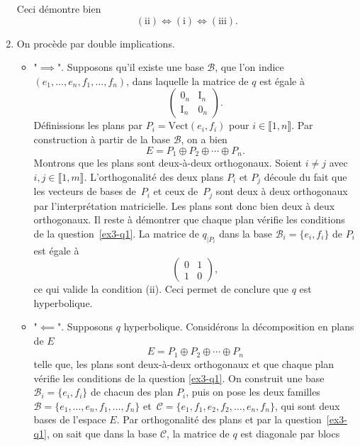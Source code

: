 \documentclass{../../td}
\begin{document}
\begin{enumerate}
\begin{itemize}
      \end{itemize}
      Ceci démontre bien \[
        (\text{ii}) \iff (\text{i}) \iff (\text{iii})
      .\] 
    \item On procède par double implications.
      \label{ex3-q2}
      \begin{itemize}
        \item "$\implies$".
          Supposons qu'il existe une base $\mathcal{B}$, que l'on indice $(e_1, \ldots, e_n, f_1, \ldots, f_n)$, dans laquelle la matrice de $q$ est égale à \[
            \begin{pmatrix} 0_n & \mathrm{I}_n \\ \mathrm{I}_n & 0_n \end{pmatrix}
          .\]
          Définissions les plans par $P_i = \mathrm{Vect}(e_i, f_i)$ pour $i \in \llbracket 1,n\rrbracket$.
          Par construction à partir de la base $\mathcal{B}$, on a bien \[
            E = P_1 \oplus P_2 \oplus \cdots \oplus P_n
          .\]
          Montrons que les plans sont deux-à-deux orthogonaux.
          Soient $i \neq j$ avec $i, j \in \llbracket 1,m\rrbracket$.
          L'orthogonalité des deux plans $P_i$ et $P_j$ découle du fait que les vecteurs de bases de~$P_i$ et ceux de~$P_j$ sont deux à deux orthogonaux par l'interprétation matricielle.
          Les plans sont donc bien deux à deux orthogonaux.
          Il reste à démontrer que chaque plan vérifie les conditions de la question~\ref{ex3-q1}.
          La matrice de $q_{|P_i}$ dans la base $\mathcal{B}_i = \{e_i,f_i\}$ de $P_i$ est égale à  
          \[
            \begin{pmatrix} 0 & 1 \\ 1 & 0 \end{pmatrix} 
          ,\] ce qui valide la condition (ii).
          Ceci permet de conclure que $q$ est hyperbolique.
        \item "$\impliedby$". Supposons $q$ hyperbolique.
          Considérons la décomposition en plans de $E$ \[
            E = P_1 \oplus P_2 \oplus \cdots \oplus P_n
          \] telle que, les plans sont deux-à-deux orthogonaux et que chaque plan vérifie les conditions de la question \ref{ex3-q1}.
          On construit une base $\mathcal{B}_i = \{e_i, f_i\}$ de chacun des plan $P_i$, puis on pose les deux familles $\mathcal{B} = \{e_1, \ldots, e_n, f_1, \ldots, f_n\}$ et~$\mathcal{C} = \{e_1, f_1, e_2, f_2, \ldots, e_n, f_n\}$, qui sont deux bases de l'espace $E$.
          Par orthogonalité des plans et par la question~\ref{ex3-q1}, on sait que dans la base $\mathcal{C}$, la matrice de $q$ est diagonale par blocs

\end{itemize}
\end{enumerate}
\end{document}

